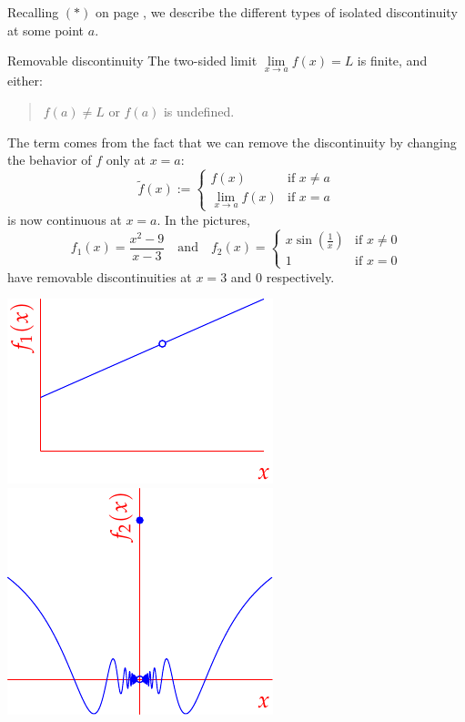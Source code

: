 
Recalling $(\ast)$ on page \pageref{it:contlimit}, we describe the different types of isolated discontinuity at some point $a$.
\begin{description}
	\begin{minipage}[t]{0.65\linewidth}\vspace{0pt}
	\item[Removable discontinuity] The two-sided limit $\lim\limits_{x\to a}f(x)=L$ is finite, and either:
	\begin{quote}
	  $f(a)\neq L$ or $f(a)$ is undefined.
	\end{quote}
	The term comes from the fact that we can remove the discontinuity by changing the behavior of $f$ only at $x=a$:
	\[\tilde f(x):=\begin{cases}
	f(x)&\text{if }x\neq a\\
	\lim\limits_{x\to a}f(x)&\text{if }x=a
	\end{cases}\]
	is now continuous at $x=a$. In the pictures,
	\[f_1(x)=\frac{x^2-9}{x-3}\quad\text{and}\quad f_2(x)=\begin{cases}
  x\sin(\frac 1x)&\text{if }x\neq 0\\
  1&\text{if }x=0
  \end{cases}\]
	have removable discontinuities at $x=3$ and $0$ respectively.
	\end{minipage}
	\begin{minipage}[t]{0.34\linewidth}\vspace{0pt}
	\flushright\includegraphics{discont1}\\\vfill
	\includegraphics{discont2}

\end{minipage}
\end{description}
